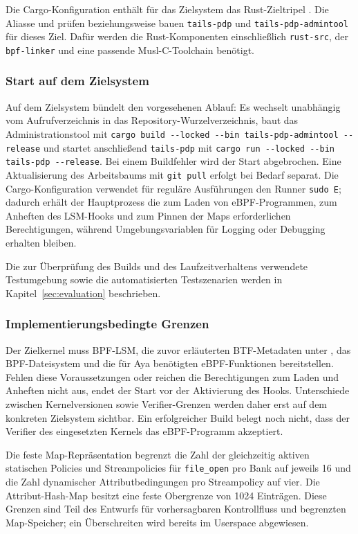 Die Cargo-Konfiguration enthält für das Zielsystem das Rust-Zieltripel . Die Aliasse \mbox{} und  prüfen beziehungsweise bauen \texttt{tails-pdp} und \texttt{tails-pdp-admintool} für dieses Ziel. Dafür werden die Rust-Komponenten einschließlich \texttt{rust-src}, der \texttt{bpf-linker} und eine passende Musl-C-Toolchain benötigt.

\subsubsection{Start auf dem Zielsystem}
Auf dem Zielsystem bündelt  den vorgesehenen Ablauf: Es wechselt unabhängig vom Aufrufverzeichnis in das Repository-Wurzelverzeichnis, baut das Administrationstool mit \texttt{cargo build -{}-locked -{}-bin tails-pdp-admintool -{}-release} und startet anschließend \texttt{tails-pdp} mit \texttt{cargo run -{}-locked -{}-bin tails-pdp -{}-release}. Bei einem Buildfehler wird der Start abgebrochen. Eine Aktualisierung des Arbeitsbaums mit \texttt{git pull} erfolgt bei Bedarf separat. Die Cargo-Konfiguration verwendet für reguläre Ausführungen den Runner \texttt{sudo~\-E}; dadurch erhält der Hauptprozess die zum Laden von eBPF-Programmen, zum Anheften des LSM-Hooks und zum Pinnen der Maps erforderlichen Berechtigungen, während Umgebungsvariablen für Logging oder Debugging erhalten bleiben.

Die zur Überprüfung des Builds und des Laufzeitverhaltens verwendete Testumgebung sowie die automatisierten Testszenarien werden in Kapitel~\ref{sec:evaluation} beschrieben.

\subsubsection{Implementierungsbedingte Grenzen}
Der Zielkernel muss BPF-LSM, die zuvor erläuterten BTF-Metadaten unter \mbox{}, das BPF-Dateisystem und die für Aya benötigten eBPF-Funktionen bereitstellen. Fehlen diese Voraussetzungen oder reichen die Berechtigungen zum Laden und Anheften nicht aus, endet der Start vor der Aktivierung des Hooks. Unterschiede zwischen Kernelversionen sowie Verifier-Grenzen werden daher erst auf dem konkreten Zielsystem sichtbar. Ein erfolgreicher Build belegt noch nicht, dass der Verifier des eingesetzten Kernels das eBPF-Programm akzeptiert.

Die feste Map-Repräsentation begrenzt die Zahl der gleichzeitig aktiven statischen Policies und Streampolicies für \texttt{file\_open} pro Bank auf jeweils 16 und die Zahl dynamischer Attributbedingungen pro Streampolicy auf vier. Die Attribut-Hash-Map besitzt eine feste Obergrenze von 1024 Einträgen. Diese Grenzen sind Teil des Entwurfs für vorhersagbaren Kontrollfluss und begrenzten Map-Speicher; ein Überschreiten wird bereits im Userspace abgewiesen.

